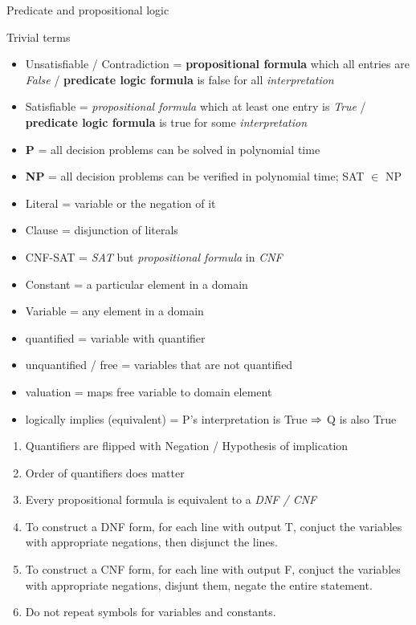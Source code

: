 \documentclass{alittlebear}
\begin{document}
\begin{unit}{Predicate and propositional logic}{}
\begin{note}{Trivial terms}
\begin{itemize}
            \item Unsatisfiable / Contradiction = \textbf{propositional formula} which all entries are \textit{False} / \textbf{predicate logic formula} is false for all \textit{interpretation}
            \item Satisfiable = \textit{propositional formula} which at least one entry is \textit{True} / \textbf{predicate logic formula} is true for some \textit{interpretation}\\
            \item \textbf{P} = all decision problems can be solved in polynomial time
            \item \textbf{NP} = all decision problems can be verified in polynomial time; SAT $\in$ NP
            \item Literal = variable or the negation of it
            \item Clause = disjunction of literals
            \item CNF-SAT = \textit{SAT} but \textit{propositional formula} in \textit{CNF}\\
            \item Constant = a particular element in a domain
            \item Variable = any element in a domain
            \item quantified = variable with quantifier
            \item unquantified / free = variables that are not quantified
            \item valuation = maps free variable to domain element
            \item logically implies (equivalent) = P's interpretation is True $\Rightarrow$ Q is also True
        \end{itemize}
    \end{note}
    \begin{hint}{\hfill}
        \begin{enumerate}
            \item Quantifiers are flipped with Negation / Hypothesis of implication
            \item Order of quantifiers does matter
            \item Every propositional formula is equivalent to a \textit{DNF / CNF}
            \item To construct a DNF form, for each line with output T, conjuct the variables with appropriate negations, then disjunct the lines.
            \item To construct a CNF form, for each line with output F, conjuct the variables with appropriate negations, disjunt them, negate the entire statement. 
            \item Do not repeat symbols for variables and constants.
        \end{enumerate}
    \end{hint}
\end{unit}
\end{document}
